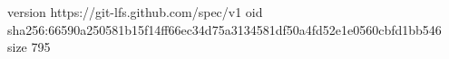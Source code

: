 version https://git-lfs.github.com/spec/v1
oid sha256:66590a250581b15f14ff66ec34d75a3134581df50a4fd52e1e0560cbfd1bb546
size 795
